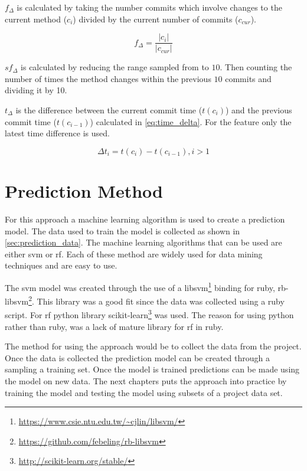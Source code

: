 $f_{\Delta}$ is calculated by taking the number commits which involve changes to the current method ($c_i$) divided by the current number of commits ($c_{cur}$).

\begin{equation}
\label{eq:freq_change}
f_{\Delta} = \frac{|c_i|}{|c_{cur}|}
\end{equation}

$sf_{\Delta}$ is calculated by reducing the range sampled from to $10$. Then counting the number of times the method changes within the previous $10$ commits and dividing it by 10.


$t_\Delta$ is the difference between the current commit time ($t(c_i)$) and the previous commit time ($t(c_{i-1})$) calculated in \autoref{eq:time_delta}. For the feature only the latest time difference is used.

\begin{equation}
\label{eq:time_delta}
\Delta t_{i} = t(c_i) - t(c_{i-1}), i > 1
\end{equation}

\section{Prediction Method}
\label{sec:prediction_method}


For this approach a machine learning algorithm is used to create a prediction model. The data used to train the model is collected as shown in \autoref{sec:prediction_data}. The machine learning algorithms that can be used are either \gls{svm} or \gls{rf}. Each of these method are widely used for data mining techniques and are easy to use. 

The \gls{svm} model was created through the use of a libsvm\footnote{\url{https://www.csie.ntu.edu.tw/~cjlin/libsvm/}} binding for ruby, rb-libsvm\footnote{\url{https://github.com/febeling/rb-libsvm}}. This library was a good fit since the data was collected using a ruby script. For \gls{rf} python library scikit-learn\footnote{\url{http://scikit-learn.org/stable/}} was used. The reason for using python rather than ruby, was a lack of mature library for \gls{rf} in ruby.

The method for using the approach would be to collect the data from the project. Once the data is collected the prediction model can be created through a sampling a training set. Once the model is trained predictions can be made using the model on new data. The next chapters puts the approach into practice by training the model and testing the model using subsets of a project data set.